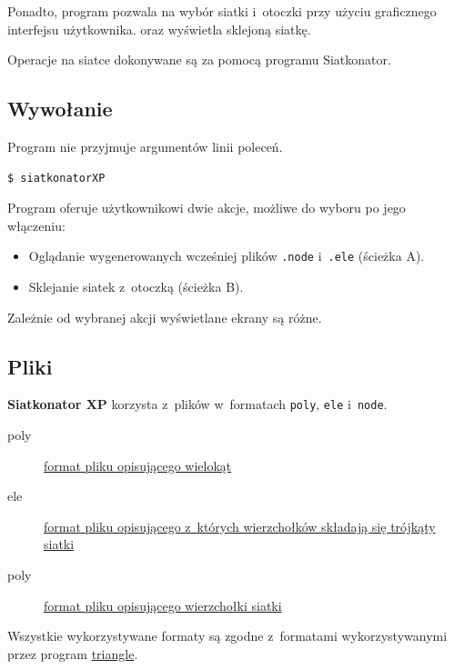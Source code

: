 \documentclass[a4paper]{article}
\newcommand{\siatkonator}{\textbf{Siatkonator XP} }
\renewcommand{\triangle}{\href{http://www.cs.cmu.edu/~quake/triangle.html}{triangle}}
\begin{document}
Ponadto, program pozwala na wybór siatki i~otoczki przy użyciu graficznego interfejsu użytkownika. oraz wyświetla sklejoną siatkę.

Operacje na siatce dokonywane są za pomocą programu Siatkonator.


\subsection{Wywołanie}
Program nie przyjmuje argumentów linii poleceń.

\begin{lstlisting}[caption=Przykładowe wywołanie]
  $ siatkonatorXP
\end{lstlisting}

Program oferuje użytkownikowi dwie akcje, możliwe do wyboru po jego włączeniu:
\begin{itemize}
  \item Oglądanie wygenerowanych wcześniej plików \texttt{.node} i~\texttt{.ele} (ścieżka A).
  \item Sklejanie siatek z~otoczką (ścieżka B).
\end{itemize}

Zależnie od wybranej akcji wyświetlane ekrany są różne.

\subsection{Pliki}
\siatkonator korzysta z~plików w~formatach \texttt{poly}, \texttt{ele} i~\texttt{node}.

\begin{description}
  \item[poly] \href{http://www.cs.cmu.edu/~quake/triangle.poly.html}{format pliku opisującego wielokąt}
  \item[ele] \href{http://www.cs.cmu.edu/~quake/triangle.ele.html}{format pliku opisującego z~których wierzchołków składają się trójkąty siatki}
  \item[poly] \href{http://www.cs.cmu.edu/~quake/triangle.poly.html}{format pliku opisującego wierzchołki siatki}
\end{description}

Wszystkie wykorzystywane formaty są zgodne z~formatami wykorzystywanymi przez program \triangle.
\end{document}
